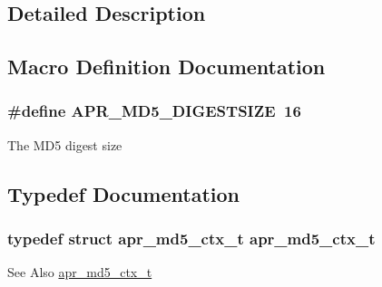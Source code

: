 \subsection{Detailed Description}


\subsection{Macro Definition Documentation}
\hypertarget{group___a_p_r___m_d5_ga0bb65e74ccdddca6ef75e886084e52dc}{
\subsubsection[{A\-P\-R\-\_\-\-M\-D5\-\_\-\-D\-I\-G\-E\-S\-T\-S\-I\-Z\-E}]{\setlength{\rightskip}{0pt plus 5cm}\#define A\-P\-R\-\_\-\-M\-D5\-\_\-\-D\-I\-G\-E\-S\-T\-S\-I\-Z\-E~16}}\label{group___a_p_r___m_d5_ga0bb65e74ccdddca6ef75e886084e52dc}
The M\-D5 digest size 

\subsection{Typedef Documentation}
\hypertarget{group___a_p_r___m_d5_gacb4d6bf2cf0a29553a63273ff0a6fe69}{
\subsubsection[{apr\-\_\-md5\-\_\-ctx\-\_\-t}]{\setlength{\rightskip}{0pt plus 5cm}typedef struct {\bf apr\-\_\-md5\-\_\-ctx\-\_\-t} {\bf apr\-\_\-md5\-\_\-ctx\-\_\-t}}}\label{group___a_p_r___m_d5_gacb4d6bf2cf0a29553a63273ff0a6fe69}
\begin{DoxySeeAlso}{See Also}
\hyperlink{structapr__md5__ctx__t}{apr\-\_\-md5\-\_\-ctx\-\_\-t} 
\end{DoxySeeAlso}


